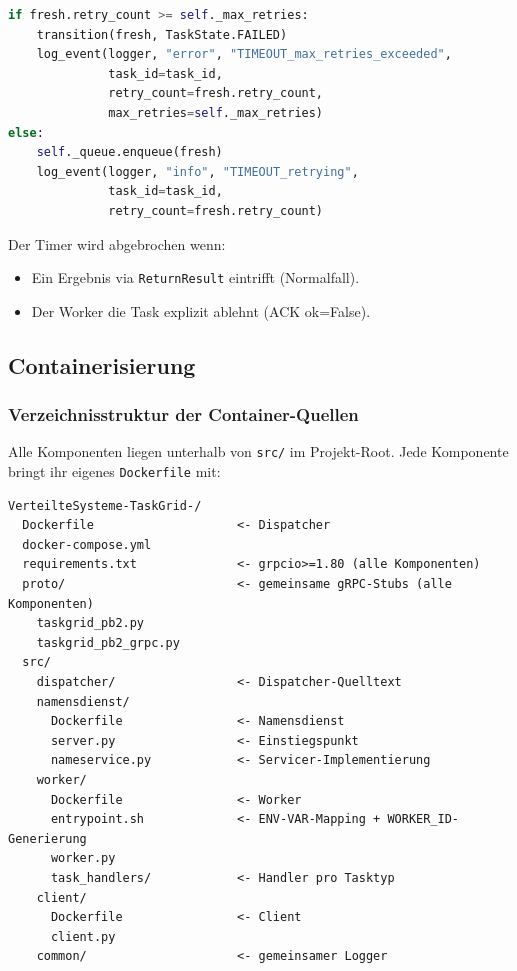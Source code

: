 \begin{lstlisting}[language=Python,caption={Timeout-Behandlung (dispatch\_loop.py)}]
if fresh.retry_count >= self._max_retries:
    transition(fresh, TaskState.FAILED)
    log_event(logger, "error", "TIMEOUT_max_retries_exceeded",
              task_id=task_id,
              retry_count=fresh.retry_count,
              max_retries=self._max_retries)
else:
    self._queue.enqueue(fresh)
    log_event(logger, "info", "TIMEOUT_retrying",
              task_id=task_id,
              retry_count=fresh.retry_count)
\end{lstlisting}

Der Timer wird abgebrochen wenn:
\begin{itemize}
  \item Ein Ergebnis via \texttt{ReturnResult} eintrifft (Normalfall).
  \item Der Worker die Task explizit ablehnt (ACK ok=False).
\end{itemize}

\subsection{Containerisierung}
\label{sec:containerisierung}

\subsubsection*{Verzeichnisstruktur der Container-Quellen}

Alle Komponenten liegen unterhalb von \texttt{src/} im Projekt-Root.
Jede Komponente bringt ihr eigenes \texttt{Dockerfile} mit:

\begin{lstlisting}[language={},caption={Container-relevante Verzeichnisstruktur}]
VerteilteSysteme-TaskGrid-/
  Dockerfile                    <- Dispatcher
  docker-compose.yml
  requirements.txt              <- grpcio>=1.80 (alle Komponenten)
  proto/                        <- gemeinsame gRPC-Stubs (alle Komponenten)
    taskgrid_pb2.py
    taskgrid_pb2_grpc.py
  src/
    dispatcher/                 <- Dispatcher-Quelltext
    namensdienst/
      Dockerfile                <- Namensdienst
      server.py                 <- Einstiegspunkt
      nameservice.py            <- Servicer-Implementierung
    worker/
      Dockerfile                <- Worker
      entrypoint.sh             <- ENV-VAR-Mapping + WORKER_ID-Generierung
      worker.py
      task_handlers/            <- Handler pro Tasktyp
    client/
      Dockerfile                <- Client
      client.py
    common/                     <- gemeinsamer Logger
\end{lstlisting}

